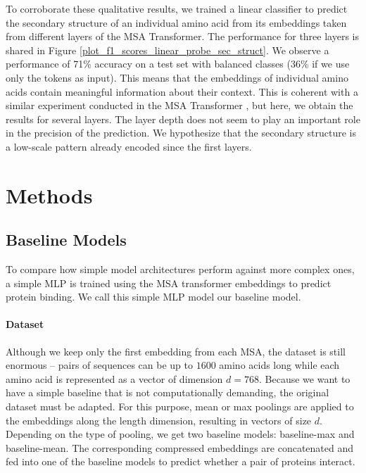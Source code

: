 \documentclass[11pt,a4paper]{article}
\begin{document}
To corroborate these qualitative results, we trained a linear classifier to predict the secondary structure of an individual amino acid from its embeddings taken from different layers of the MSA Transformer. The performance for three layers is shared in Figure \ref{plot_f1_scores_linear_probe_sec_struct}. We observe a performance of 71\% accuracy on a test set with balanced classes (36\% if we use only the tokens as input).
This means that the embeddings of individual amino acids contain meaningful information about their context. This is coherent with a similar experiment conducted in the MSA Transformer \cite{rao2021msa}, but here, we obtain the results for several layers. The layer depth does not seem to play an important role in the precision of the prediction. We hypothesize that the secondary structure is a low-scale pattern already encoded since the first layers.


\section{Methods}



\subsection{Baseline Models}
To compare how simple model architectures perform against more complex ones, a simple MLP is trained using the MSA transformer embeddings to predict protein binding. We call this simple MLP model our baseline model.


\paragraph{Dataset}
Although we keep only the first embedding from each MSA, the dataset is still enormous -- pairs of sequences can be up to $1600$ amino acids long while each amino acid is represented as a vector of dimension $d = 768$. Because we want to have a simple baseline that is not computationally demanding, the original dataset must be adapted. For this purpose, mean or max poolings are applied to the embeddings along the length dimension, resulting in vectors of size $d$. Depending on the type of pooling, we get two baseline models: baseline-max and baseline-mean. The corresponding compressed embeddings are concatenated and fed into one of the baseline models to predict whether a pair of proteins interact.
\end{document}
